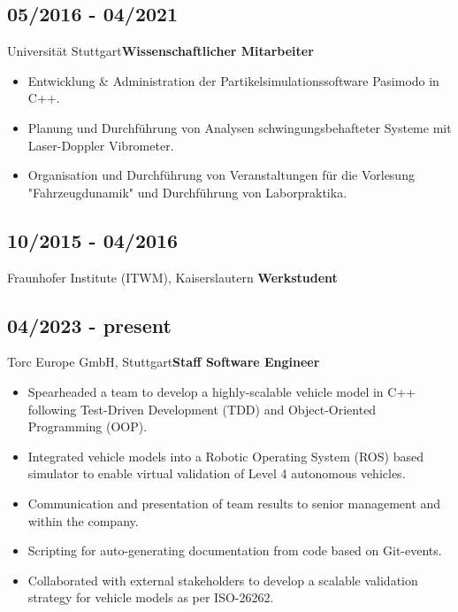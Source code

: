 \documentclass{classic}
\begin{document}
\begin{paracol}{2}
{        \subsection{05/2016 - 04/2021}{Universit{\"a}t
            Stuttgart}{{\bfseries Wissenschaftlicher Mitarbeiter}}
           \begin{itemize}
               \item Entwicklung \& Administration der Partikelsimulationssoftware
                   Pasimodo in C++.
               \item Planung und Durchf{\"u}hrung von Analysen
                   schwingungsbehafteter Systeme mit Laser-Doppler Vibrometer.
               \item Organisation und Durchf{\"u}hrung von Veranstaltungen f{\"u}r
                   die Vorlesung "Fahrzeugdunamik" und Durchf{\"u}hrung von
                   Laborpraktika.
           \end{itemize}

        \subsection{10/2015 - 04/2016}{Fraunhofer Institute (ITWM), Kaiserslautern}
            {{\bfseries Werkstudent}}\\
}
{
    \subsection{04/2023 - present}{Torc Europe GmbH, Stuttgart}{{\bfseries Staff Software Engineer}}
          \begin{itemize}
            \item Spearheaded a team to develop a highly-scalable
                vehicle model in C++ following Test-Driven Development
                (TDD) and Object-Oriented Programming (OOP).
            \item Integrated vehicle models into a Robotic Operating System (ROS)
                based simulator to enable virtual validation of Level 4
                autonomous vehicles.
            \item Communication and presentation of team results to senior management and within the company.
            \item Scripting for auto-generating documentation from code based on Git-events.
            \item Collaborated with external stakeholders to develop a scalable
                validation strategy for vehicle models as per ISO-26262.
          \end{itemize}
    
}
\end{paracol}
\end{document}
